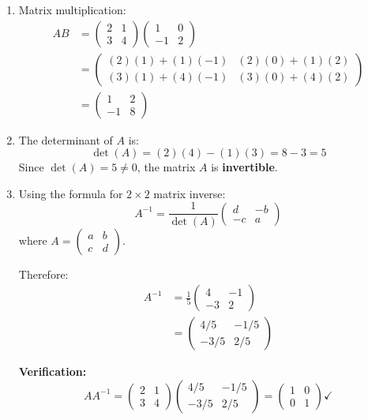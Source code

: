 \begin{solution}
\begin{enumerate}[label=(\alph*)]
    \item Matrix multiplication:
    \begin{align*}
        AB &= \begin{pmatrix} 2 & 1 \\ 3 & 4 \end{pmatrix} \begin{pmatrix} 1 & 0 \\ -1 & 2 \end{pmatrix} \\
        &= \begin{pmatrix}
            (2)(1) + (1)(-1) & (2)(0) + (1)(2) \\
            (3)(1) + (4)(-1) & (3)(0) + (4)(2)
        \end{pmatrix} \\
        &= \begin{pmatrix} 1 & 2 \\ -1 & 8 \end{pmatrix}
    \end{align*}

    \item The determinant of $A$ is:
    \[
    \det(A) = (2)(4) - (1)(3) = 8 - 3 = 5
    \]
    Since $\det(A) = 5 \neq 0$, the matrix $A$ is \textbf{invertible}.

    \item Using the formula for $2 \times 2$ matrix inverse:
    \[
    A^{-1} = \frac{1}{\det(A)} \begin{pmatrix} d & -b \\ -c & a \end{pmatrix}
    \]
    where $A = \begin{pmatrix} a & b \\ c & d \end{pmatrix}$.

    Therefore:
    \begin{align*}
        A^{-1} &= \frac{1}{5} \begin{pmatrix} 4 & -1 \\ -3 & 2 \end{pmatrix} \\
        &= \begin{pmatrix} 4/5 & -1/5 \\ -3/5 & 2/5 \end{pmatrix}
    \end{align*}

    \textbf{Verification:}
    \[
    AA^{-1} = \begin{pmatrix} 2 & 1 \\ 3 & 4 \end{pmatrix} \begin{pmatrix} 4/5 & -1/5 \\ -3/5 & 2/5 \end{pmatrix} = \begin{pmatrix} 1 & 0 \\ 0 & 1 \end{pmatrix} \checkmark
    \]
\end{enumerate}
\end{solution}

